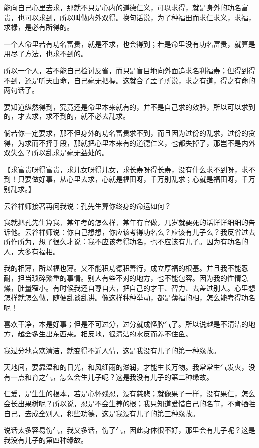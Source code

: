 \documentclass[12pt,twoside,openany]{book}
\newcommand{\kai}[1]{{\CJKfamily{kai}#1}}
\begin{document}
能向自己心里去求，那就不只是心内的道德仁义，可以求得，就是身外的功名富贵，也可以求到，所以叫做内外双得。换句话说，为了种福田而求仁求义，求福，求禄，是必有所得的。

一个人命里若有功名富贵，就是不求，也会得到；若是命里没有功名富贵，就算是用尽了方法，也求不到的。

所以一个人，若不能自己检讨反省，而只是盲目地向外面追求名利福寿；但得到得不到，还是听天由命，自己毫无把握。这就合了孟子所说，求之有道，得之有命的两句话了。

要知道纵然得到，究竟还是命里本来就有的，并不是自己求的效验，所以可以求到的，才去求，求不到的，就不必去乱求。

倘若你一定要求，那不但身外的功名富贵求不到，而且因为过份的乱求，过份的贪得，为求而不择手段，那就把心里本来有的道德仁义，也都失掉了，那岂不是内外双失么？所以乱求是毫无益处的。

【\kai{求富贵呀得富贵，求儿女呀得儿女，求长寿呀得长寿，没有什么求不到呀，求不到！只要做好事，从心里去求，心就是福田呀，千万别乱求；心就是福田呀，千万别乱求。}】

云谷禅师接著再问我说：孔先生算你终身的命运如何？

我就把孔先生算我，某年考的怎么样，某年有官做，几岁就要死的话详详细细的告诉他。云谷禅师说：你自己想想，你应该考得功名么？应该有儿子么？我反省过去所作所为，想了很久才说：我不应该考得功名，也不应该有儿子。因为有功名的人，大多有福相。

我的相薄，所以福也薄。又不能积功德积善行，成立厚福的根基。并且我不能忍耐，担当琐碎繁重的事情。别人有些不对的地方，也不能包容。因为我的性情急燥，肚量窄小。有时候我还自尊自大，把自己的才干、智力、去盖过别人。心里想怎样就怎么做，随便乱谈乱讲。像这样种种举动，都是薄福的相，怎么能考得功名呢！

喜欢干净，本是好事；但是不可过分，过分就成怪脾气了。所以说越是不清洁的地方，越会多生出东西来。相反地，很清洁的水反而养不住鱼。

我过分地喜欢清洁，就变得不近人情，这是我没有儿子的第一种缘故。

天地间，要靠温和的日光，和风细雨的滋润，才能生长万物。我常常生气发火，没有一点和育之气，怎么会生儿子呢？这是我没有儿子的第二种缘故。

仁爱，是生生的根本，若是心怀残忍，没有慈悲；就像果子一样，没有果仁，怎么会长出果树呢？所以说，忍是不会生养的根；我只知道爱惜自己的名节，不肯牺牲自己，去成全别人，积些功德，这是我没有儿子的第三种缘故。

说话太多容易伤气，我又多话，伤了气，因此身体很不好，那里会有儿子呢？这是我没有儿子的第四种缘故。
\end{document}
